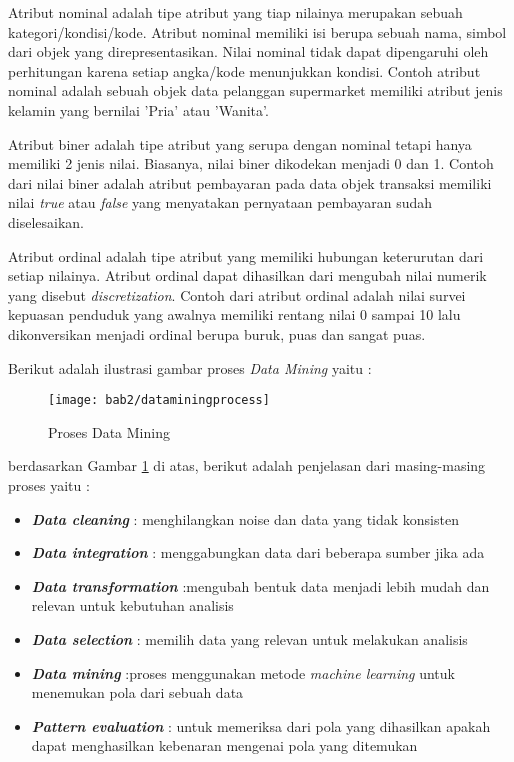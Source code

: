 Atribut nominal adalah tipe atribut yang tiap nilainya merupakan sebuah kategori/kondisi/kode. Atribut nominal memiliki isi berupa sebuah nama, simbol dari objek yang direpresentasikan. Nilai nominal tidak dapat dipengaruhi oleh perhitungan karena setiap angka/kode menunjukkan kondisi. Contoh atribut nominal adalah sebuah objek data pelanggan supermarket memiliki atribut jenis kelamin yang bernilai 'Pria' atau 'Wanita'.
 
Atribut biner adalah tipe atribut yang serupa dengan nominal tetapi hanya memiliki 2 jenis nilai. Biasanya, nilai biner dikodekan menjadi 0 dan 1. Contoh dari nilai biner adalah atribut pembayaran pada data objek transaksi memiliki nilai \textit{true} atau \textit{false} yang menyatakan pernyataan pembayaran sudah diselesaikan.

Atribut ordinal adalah tipe atribut yang memiliki hubungan keterurutan dari setiap nilainya. Atribut ordinal dapat dihasilkan dari mengubah nilai numerik yang disebut \textit{discretization}. Contoh dari atribut ordinal adalah nilai survei kepuasan penduduk yang awalnya memiliki rentang nilai 0 sampai 10 lalu dikonversikan menjadi ordinal berupa buruk, puas dan sangat puas. 

Berikut adalah ilustrasi gambar proses \textit{Data Mining} yaitu : 


\begin{figure}[h!]
	\centering  
	\texttt{[image: bab2/dataminingprocess]}   
	\caption{Proses Data Mining}
	\label{fig:dataminingprocess} 
\end{figure} 

berdasarkan Gambar \ref{fig:dataminingprocess} di atas, berikut adalah penjelasan dari masing-masing proses yaitu :
 
\begin{itemize}
\item \textbf{\textit{Data cleaning}} : menghilangkan noise dan data yang tidak konsisten
\item \textbf{\textit{Data integration}} : menggabungkan data dari beberapa sumber jika ada
\item \textbf{\textit{Data transformation}} :mengubah bentuk data menjadi lebih mudah dan relevan untuk kebutuhan analisis
\item \textbf{\textit{Data selection}} : memilih data yang relevan untuk melakukan analisis
\item \textbf{\textit{Data mining}} :proses menggunakan metode \textit{machine learning} untuk menemukan pola dari sebuah data 
\item \textbf{\textit{Pattern evaluation}} : untuk memeriksa dari pola yang dihasilkan apakah dapat menghasilkan kebenaran mengenai pola yang ditemukan
\end{itemize}


